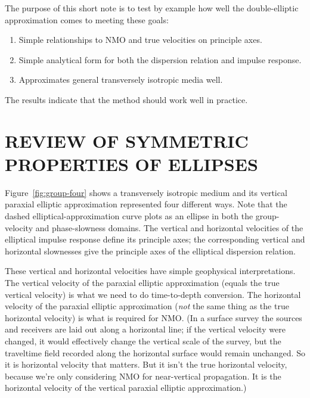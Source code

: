 The purpose of this short note is to test by example how well
the double-elliptic approximation comes to meeting these goals:
\begin{enumerate}
\item Simple relationships to NMO and true velocities on principle axes.
\item Simple analytical form for both the dispersion relation and impulse 
response.
\item Approximates general transversely isotropic media well.
\end{enumerate}
The results indicate that the method should work well in practice.

\section{REVIEW OF SYMMETRIC PROPERTIES OF ELLIPSES}
Figure~\ref{fig:group-four} shows a transversely isotropic medium
and its vertical paraxial elliptic approximation represented
four different ways. Note that the dashed elliptical-approximation curve
plots as an ellipse in both the group-velocity and phase-slowness domains.
The vertical and horizontal velocities of the elliptical impulse response
define its principle axes; the corresponding vertical and horizontal
slownesses give the principle axes of the elliptical dispersion relation.



These vertical and horizontal velocities have simple geophysical
interpretations. The vertical velocity
of the paraxial elliptic approximation
(equals the true vertical velocity)
is what we need to do time-to-depth
conversion.
The horizontal velocity
of the paraxial elliptic approximation
({\em not\/} the same thing as the true horizontal velocity)
is what is required for NMO.
(In a surface survey the sources and receivers are laid out along a
horizontal line; if the vertical velocity were changed,
it would effectively change the vertical scale of the survey, but
the traveltime field recorded along the horizontal surface would
remain unchanged.
So it is horizontal velocity that matters. But it isn't the true
horizontal velocity, because we're only considering NMO for near-vertical
propagation. It is the horizontal velocity of the vertical paraxial
elliptic approximation.)

